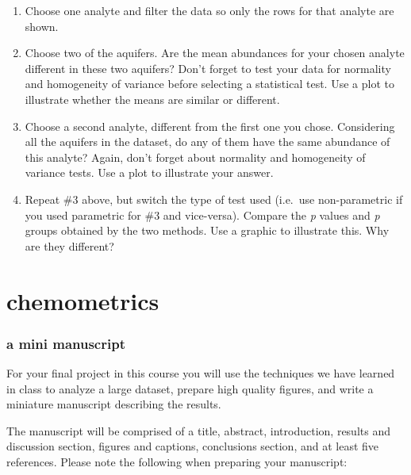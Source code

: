 \documentclass[
]{krantz}
\begin{document}
\begin{enumerate}
\def\labelenumi{\arabic{enumi}.}
\item
  Choose one analyte and filter the data so only the rows for that analyte are shown.
\item
  Choose two of the aquifers. Are the mean abundances for your chosen analyte different in these two aquifers? Don't forget to test your data for normality and homogeneity of variance before selecting a statistical test. Use a plot to illustrate whether the means are similar or different.
\item
  Choose a second analyte, different from the first one you chose. Considering all the aquifers in the dataset, do any of them have the same abundance of this analyte? Again, don't forget about normality and homogeneity of variance tests. Use a plot to illustrate your answer.
\item
  Repeat \#3 above, but switch the type of test used (i.e.~use non-parametric if you used parametric for \#3 and vice-versa). Compare the \emph{p} values and \emph{p} groups obtained by the two methods. Use a graphic to illustrate this. Why are they different?
\end{enumerate}

\hypertarget{section-3}{%
\section*{}\label{section-3}}

\hypertarget{part-chemometrics-1}{%
\part{chemometrics}\label{part-chemometrics-1}}

\hypertarget{a-mini-manuscript}{%
\section*{a mini manuscript}\label{a-mini-manuscript}}

For your final project in this course you will use the techniques we have learned in class to analyze a large dataset, prepare high quality figures, and write a miniature manuscript describing the results.

The manuscript will be comprised of a title, abstract, introduction, results and discussion section, figures and captions, conclusions section, and at least five references. Please note the following when preparing your manuscript:
\end{document}
